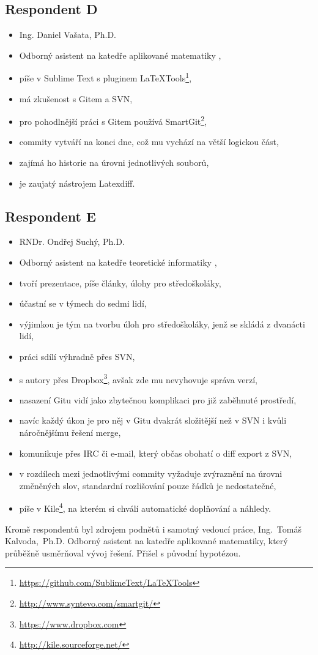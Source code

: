 \subsection{Respondent D}

\begin{itemize}
	\item Ing. Daniel Vašata, Ph.D.
	\item Odborný asistent na katedře aplikované matematiky \cite{kam},
	\item píše v Sublime Text s pluginem LaTeXTools\footnote{\url{https://github.com/SublimeText/LaTeXTools}},
	\item má zkušenost s Gitem a SVN,
	\item pro pohodlnější práci s Gitem používá SmartGit\footnote{\url{http://www.syntevo.com/smartgit/}},
	\item commity vytváří na konci dne, což mu vychází na větší logickou část,
	\item zajímá ho historie na úrovni jednotlivých souborů,
	\item je zaujatý nástrojem Latexdiff.
\end{itemize}


\subsection{Respondent E}

\begin{itemize}
	\item RNDr. Ondřej Suchý, Ph.D.
	\item Odborný asistent na katedře teoretické informatiky \cite{kti},
	\item tvoří prezentace, píše články, úlohy pro středoškoláky,
	\item účastní se v týmech do sedmi lidí,
	\item výjimkou je tým na tvorbu úloh pro středoškoláky, jenž se skládá z dvanácti lidí,
	\item práci sdílí výhradně přes SVN,
	\item s  autory přes Dropbox\footnote{\url{https://www.dropbox.com}}, avšak zde mu nevyhovuje správa verzí,
	\item nasazení Gitu vidí jako zbytečnou komplikaci pro již zaběhnuté prostředí,
	\item navíc každý úkon je pro něj v Gitu dvakrát složitější než v SVN i kvůli náročnějšímu řešení merge,
	\item komunikuje přes IRC či e-mail, který občas obohatí o diff export z SVN,
	\item v rozdílech mezi jednotlivými commity vyžaduje zvýraznění na úrovni změněných slov, standardní rozlišování pouze řádků je nedostatečné,
	\item píše v Kile\footnote{\url{http://kile.sourceforge.net/}}, na kterém si chválí automatické doplňování a náhledy.
\end{itemize}

Kromě respondentů byl zdrojem podnětů i samotný vedoucí práce, Ing.~Tomáš Kalvoda,~Ph.D. Odborný asistent na katedře aplikované matematiky, který průběžně usměrňoval vývoj řešení. Přišel s původní hypotézou.